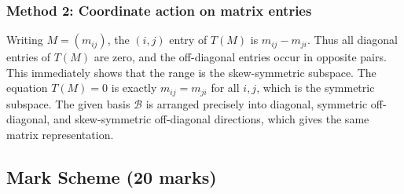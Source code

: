 \documentclass[12pt]{article}
\newcommand{\B}{\mathcal{B}}
\begin{document}
\subsubsection{Method 2: Coordinate action on matrix entries}
Writing $M=(m_{ij})$, the $(i,j)$ entry of $T(M)$ is $m_{ij}-m_{ji}$. Thus all diagonal entries of $T(M)$ are zero, and the off-diagonal entries occur in opposite pairs. This immediately shows that the range is the skew-symmetric subspace. The equation $T(M)=0$ is exactly $m_{ij}=m_{ji}$ for all $i,j$, which is the symmetric subspace. The given basis $\B$ is arranged precisely into diagonal, symmetric off-diagonal, and skew-symmetric off-diagonal directions, which gives the same matrix representation.

\subsection{Mark Scheme (20 marks)}
\end{document}
